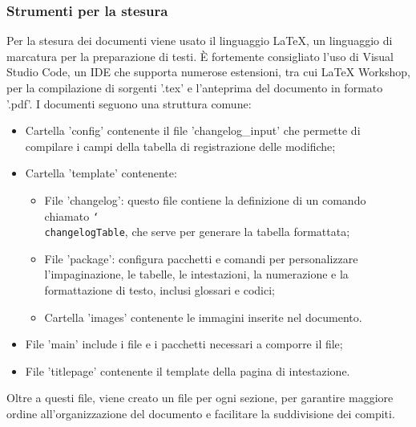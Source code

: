 \subsubsection{Strumenti per la stesura}
Per la stesura dei documenti viene usato il linguaggio LaTeX, un linguaggio di
marcatura per la preparazione di testi. È fortemente consigliato l'uso di
Visual Studio Code, un IDE che supporta numerose estensioni, tra cui LaTeX
Workshop, per la compilazione di sorgenti '.tex' e l'anteprima del documento in
formato '.pdf'. I documenti seguono una struttura comune:
\begin{itemize}
      \item Cartella 'config' contenente il file 'changelog\_input' che permette di
            compilare i campi della tabella di registrazione delle modifiche;
      \item Cartella 'template' contenente:
            \begin{itemize}
                  \item File 'changelog': questo file contiene la definizione di un comando chiamato
                        \texttt{\char`\\changelogTable}, che serve per generare la tabella formattata;
                  \item File 'package': configura pacchetti e comandi per personalizzare
                        l'impaginazione, le tabelle, le intestazioni, la numerazione e la formattazione
                        di testo, inclusi glossari e codici;
                  \item Cartella 'images' contenente le immagini inserite nel documento.
            \end{itemize}
      \item File 'main' include i file e i pacchetti necessari a comporre il file;
      \item File 'titlepage' contenente il template della pagina di intestazione.
\end{itemize}
Oltre a questi file, viene creato un file per ogni sezione, per garantire maggiore ordine all'organizzazione
del documento e facilitare la suddivisione dei compiti.

